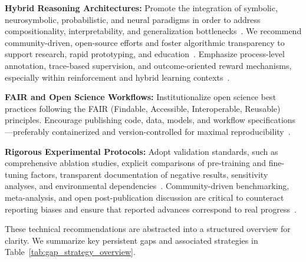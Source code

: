 \documentclass[sigconf]{acmart}
\begin{document}
\textbf{Hybrid Reasoning Architectures:}
Promote the integration of symbolic, neurosymbolic, probabilistic, and neural paradigms in order to address compositionality, interpretability, and generalization bottlenecks~\cite{ref36,ref37,ref38,ref43,ref48,ref54,ref55,ref61,ref62,ref63,ref64,ref65,ref66,ref88}. We recommend community-driven, open-source efforts and foster algorithmic transparency to support research, rapid prototyping, and education~\cite{ref38,ref46,ref48,ref54,ref86,ref87,ref92,ref93}. Emphasize process-level annotation, trace-based supervision, and outcome-oriented reward mechanisms, especially within reinforcement and hybrid learning contexts~\cite{ref38,ref46,ref48,ref54,ref65,ref87,ref92,ref93,ref97}.

\textbf{FAIR and Open Science Workflows:}
Institutionalize open science best practices following the FAIR (Findable, Accessible, Interoperable, Reusable) principles. Encourage publishing code, data, models, and workflow specifications---preferably containerized and version-controlled for maximal reproducibility~\cite{ref21,ref22,ref23,ref55,ref59,ref61,ref66,ref67,ref68,ref69,ref70,ref71,ref85,ref90,ref91,ref94,ref100,ref101,ref104,ref106,ref107,ref108}.

\textbf{Rigorous Experimental Protocols:}
Adopt validation standards, such as comprehensive ablation studies, explicit comparisons of pre-training and fine-tuning factors, transparent documentation of negative results, sensitivity analyses, and environmental dependencies~\cite{ref9,ref10,ref55,ref59,ref61,ref62,ref66,ref74,ref90,ref104,ref105,ref106,ref107,ref108}. Community-driven benchmarking, meta-analysis, and open post-publication discussion are critical to counteract reporting biases and ensure that reported advances correspond to real progress~\cite{ref22,ref45,ref55,ref61,ref88,ref101,ref106,ref107,ref108}.

These technical recommendations are abstracted into a structured overview for clarity. We summarize key persistent gaps and associated strategies in Table~\ref{tab:gap_strategy_overview}.
\end{document}
